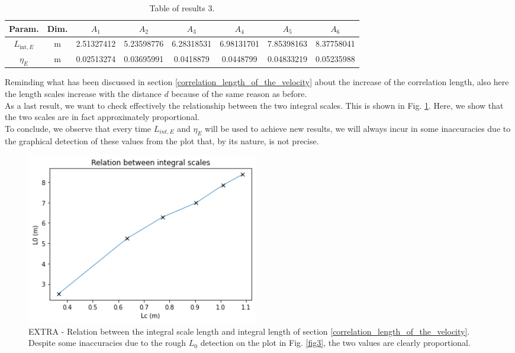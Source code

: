 \documentclass[11pt,titlepage]{article}
\begin{document}
\begin{table}[h]
\centering
\caption{Table of results 3.}\label{tab3}
    \begin{tabular}{ | c | c | c | c | c | c | c | c |}
    \hline
    Param. & Dim. & $A_1$ & $A_2$ & $A_3$ & $A_4$ & $A_5$ & $A_6$ \\
    \hline
    $L_{\mathrm{int},E}$ & m &2.51327412 &5.23598776& 6.28318531& 6.98131701& 7.85398163 &8.37758041 \\
    \hline
    $\eta_E$ & m& 0.02513274 &0.03695991 &0.0418879&  0.0448799&  0.04833219& 0.05235988  \\
    \hline
    \end{tabular}
\end{table}
Reminding what has been discussed in section \ref{correlation_length_of_the_velocity} about the increase of the correlation length, also here the length scales increase with the distance $d$ because of the same reason as before. \\
As a last result, we want to check effectively the relationship between the two integral scales. This is shown in Fig. \ref{fig4}. Here, we show that the two scales are in fact approximately proportional. \\
To conclude, we observe that every time $L_{int,E}$ and $\eta_E$ will be used to achieve new results, we will always incur in some inaccuracies due to the graphical detection of these values from the plot that, by its nature, is not precise.
	\begin{center} 
	\begin{figure} [h]
		\centering
		\includegraphics[width = 4in]{./figures/ex1_3_plus.png}
		\caption{EXTRA - Relation between the integral scale length and integral length of section \ref{correlation_length_of_the_velocity}. Despite some inaccuracies due to the rough $L_0$ detection on the plot in Fig. \ref{fig3}, the two values are clearly proportional.}
		\label{fig4}
	\end{figure}
\end{center}
\end{document}
